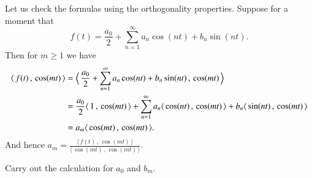 \documentclass[12pt]{book}
\begin{document}
Let us check the formulas using the orthogonality properties.  Suppose for
a moment that
\begin{equation*}
f(t) = \frac{a_0}{2} + \sum_{n=1}^\infty a_n \cos (n t) + b_n
\sin (n t) .
\end{equation*}
Then for $m \geq 1$ we have
\begin{equation*}
\begin{split}
\langle \, f(t)\,,\,\cos (mt) \, \rangle
& =
\Bigl\langle \, \frac{a_0}{2} + \sum_{n=1}^\infty a_n \cos (n t) + b_n
\sin (n t) \,,\, \cos (mt) \, \Bigr\rangle \\
& =
\frac{a_0}{2}
\langle \, 1 \, , \, \cos (mt) \, \rangle
+ \sum_{n=1}^\infty
a_n \langle \, \cos (nt) \, , \, \cos (mt) \, \rangle +
b_n \langle \, \sin (n t) \, , \, \cos (mt) \, \rangle \\
& =
a_m \langle \, \cos (mt) \, , \, \cos (mt) \, \rangle .
\end{split}
\end{equation*}
And hence
$a_m =
\frac{\langle \, f(t) \, , \, \cos (mt) \, \rangle}{\langle \, \cos (mt) \, , \,
\cos (mt) \, \rangle}$.

\begin{exercise}
Carry out the calculation for $a_0$ and $b_m$.
\end{exercise}
\end{document}
